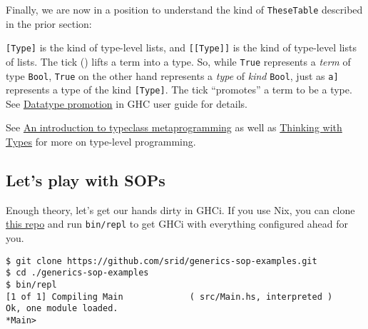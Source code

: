 Finally, we are now in a position to understand the kind of
\texttt{TheseTable} described in the prior section:

\begin{Shaded}
\begin{Highlighting}[]
 \OtherTok{ ::}  \OtherTok{{-}\textgreater{}}  \OtherTok{{-}\textgreater{}}\NormalTok{ [[}\NormalTok{]]}
 \OtherTok{=}
\NormalTok{  \textquotesingle{}[ \textquotesingle{}[ a ]}
\NormalTok{     \textquotesingle{}[ b ]}
\NormalTok{     \textquotesingle{}[ a, b ]}
\NormalTok{  ]}
\end{Highlighting}
\end{Shaded}

\texttt{{[}Type{]}} is the kind of type-level lists, and
\texttt{{[}{[}Type{]}{]}} is the kind of type-level lists of lists. The
tick (\texttt{\textquotesingle{}}) lifts a term into a type. So, while
\texttt{True} represents a \emph{term} of type \texttt{Bool},
\texttt{\textquotesingle{}True} on the other hand represents a
\emph{type} of \emph{kind} \texttt{Bool}, just as
\texttt{\textquotesingle{}{[}a{]}} represents a type of the kind
\texttt{{[}Type{]}}. The tick ``promotes'' a term to be a type. See
\href{https://ghc.gitlab.haskell.org/ghc/doc/users_guide/exts/data_kinds.html\#}{Datatype
promotion} in GHC user guide for details.

See
\href{https://lexi-lambda.github.io/blog/2021/03/25/an-introduction-to-typeclass-metaprogramming/}{An
introduction to typeclass metaprogramming} as well as
\href{https://thinkingwithtypes.com/}{Thinking with Types} for more on
type-level programming.

\hypertarget{lets-play-with-sops}{%
\subsection{Let's play with SOPs}\label{lets-play-with-sops}}

Enough theory, let's get our hands dirty in GHCi. If you use Nix, you
can clone \href{https://github.com/srid/generics-sop-examples}{this
repo} and run \texttt{bin/repl} to get GHCi with everything configured
ahead for you.

\begin{verbatim}
$ git clone https://github.com/srid/generics-sop-examples.git 
$ cd ./generics-sop-examples
$ bin/repl
[1 of 1] Compiling Main             ( src/Main.hs, interpreted )
Ok, one module loaded.
*Main>
\end{verbatim}


